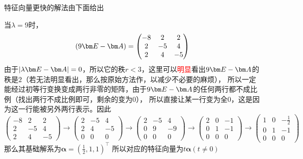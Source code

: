 特征向量更快的解法由下面给出
\begin{solution}
    当$\lambda=9$时，
    \[
        (9\mat{E}-\mat{A}) =
        \begin{pmatrix}
            -8 & 2  & 2  \\
            2  & -5 & 4  \\
            2  & 4  & -5
        \end{pmatrix}
    \]
    由于$|\lambda \mat{E} - \mat{A}|=0$，所以它的秩$r<3$，这里可以\textcolor{red}{明显}看出$9\mat{E}-\mat{A}$的秩是$2$（若无法明显看出，那么按原始方法作，以减少不必要的麻烦），
    所以一定能经过初等行变换变成两行非零的矩阵，由于$9\mat{E}-\mat{A}$的任何两行都不成比例（找出两行不成比例即可，剩余的变为$0$），
    所以直接让某一行变为全$0$，这是因为这一行能被另外两行表示。因此
    \[
        \begin{pmatrix}
            -8 & 2  & 2  \\
            2  & -5 & 4  \\
            2  & 4  & -5
        \end{pmatrix}
        \longrightarrow
        \begin{pmatrix}
            2 & -5 & 4  \\
            2 & 4  & -5 \\
            0 & 0  & 0
        \end{pmatrix}
        \longrightarrow
        \begin{pmatrix}
            2 & -5 & 4  \\
            0 & 9  & -9 \\
            0 & 0  & 0
        \end{pmatrix}
        \longrightarrow
        \begin{pmatrix}
            2 & 0 & -1 \\
            0 & 1 & -1 \\
            0 & 0 & 0
        \end{pmatrix}
        \longrightarrow
        \begin{pmatrix}
            1 & 0 & -\frac{1}{2} \\
            0 & 1 & -1           \\
            0 & 0 & 0
        \end{pmatrix}
    \]
    那么其基础解系为$\bm{\alpha} = (\frac{1}{2},1,1)^\intercal$
    所以对应的特征向量为$t\bm{\alpha} (t\neq 0)$
\end{solution}

